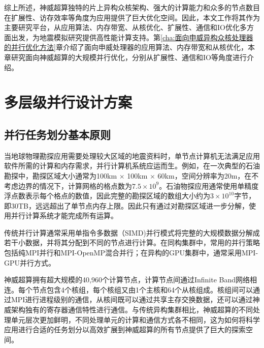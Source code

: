 综上所述，神威超算独特的片上异构众核架构、强大的计算能力和众多的节点数目在扩展性、访存效率等角度为应用提供了巨大优化空间。因此，本文工作将其作为主要研究平台，从应用算法、内存带宽、从核优化、扩展性、通信和IO优化多方面出发，为地震模拟研究提供高性能计算支持。第\ref{cha:面向申威异构众核处理器的并行优化方法}章介绍了面向申威处理器的应用算法、内存带宽和从核优化，本章研究面向神威超算的大规模并行优化，分别从扩展性、通信和IO等角度进行介绍。

\section{多层级并行设计方案}
\label{sec:多层级并行设计方案}

\subsection{并行任务划分基本原则}

当地球物理勘探应用需要处理较大区域的地震资料时，单节点计算机无法满足应用软件所需的计算和内存需求，并行计算机系统应运而生。例如，在一次典型的石油勘探中，勘探区域大小通常为100km $\times$ 100km $\times$ 60km，空间分辨率为20m，在不考虑边界的情况下，计算网格的格点数为$7.5\times10^9$。石油物探应用通常使用单精度浮点数表示每个格点的数值，因此完整的勘探区域的数组大小约为$3\times10^{10}$字节，即30TB，远远超出了单节点内存上限。因此只有通过对勘探区域进一步分解，使用并行计算系统才能完成所有运算。

传统并行计算通常采用单指令多数据（SIMD)并行模式将完整的大规模数据分解成若干小数据，并将其分配到不同的节点进行计算。在同构集群中，常用的并行策略包括纯MPI并行和MPI-OpenMP混合并行；在异构的GPU集群中，通常采用MPI-GPU并行方式。

神威超算拥有超大规模的40,960个计算节点，计算节点间通过Infinite Band网络相连。每个节点包含4个核组，每个核组又由1个主核和64个从核组成。核组间可以通过MPI进行进程级别的通信，从核间既可以通过共享主存交换数据，还可以通过神威架构独有的寄存器通信特性进行通信。与传统异构集群相比，神威超算的不同处理单元层次更加鲜明，不同处理单元的计算和通信方式各不相同，这为如何将科学应用进行合适的任务划分以高效扩展到神威超算的所有节点提供了巨大的探索空间。

